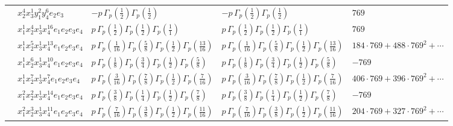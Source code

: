 \documentclass[11pt]{article}
\begin{document}
\begin{table}[ht]
{\begin{tabular}{@{}lllll@{}}
 & $x_{2}^{4} x_{3}^{1} y_{1}^{2} y_{4}^{6} e_{2} e_{3}$ & $- p \, \Gamma_p \left( \frac{1}{2} \right) \Gamma_p \left( \frac{1}{2} \right)$ & $- p \, \Gamma_p \left( \frac{1}{2} \right) \Gamma_p \left( \frac{1}{2} \right)$ & $769$ \\
 & $x_{1}^{1} x_{2}^{4} x_{3}^{1} x_{4}^{16}  e_{1} e_{2} e_{3} e_{4}$ & $p \, \Gamma_p \left( \frac{1}{2} \right) \Gamma_p \left( \frac{1}{2} \right) \Gamma_p \left( \frac{1}{1} \right)$ & $p \, \Gamma_p \left( \frac{1}{2} \right) \Gamma_p \left( \frac{1}{2} \right) \Gamma_p \left( \frac{1}{1} \right)$ & $769$ \\
 & $x_{1}^{1} x_{2}^{5} x_{3}^{1} x_{4}^{13}  e_{1} e_{2} e_{3} e_{4}$ & $p \, \Gamma_p \left( \frac{1}{16} \right) \Gamma_p \left( \frac{5}{8} \right) \Gamma_p \left( \frac{1}{2} \right) \Gamma_p \left( \frac{13}{16} \right)$ & $p \, \Gamma_p \left( \frac{1}{16} \right) \Gamma_p \left( \frac{5}{8} \right) \Gamma_p \left( \frac{1}{2} \right) \Gamma_p \left( \frac{13}{16} \right)$ & $184{\cdot}769{+}488{\cdot}769^{2}{+}\cdots$ \\
 & $x_{1}^{1} x_{2}^{6} x_{3}^{1} x_{4}^{10}  e_{1} e_{2} e_{3} e_{4}$ & $p \, \Gamma_p \left( \frac{1}{8} \right) \Gamma_p \left( \frac{3}{4} \right) \Gamma_p \left( \frac{1}{2} \right) \Gamma_p \left( \frac{5}{8} \right)$ & $p \, \Gamma_p \left( \frac{1}{8} \right) \Gamma_p \left( \frac{3}{4} \right) \Gamma_p \left( \frac{1}{2} \right) \Gamma_p \left( \frac{5}{8} \right)$ & $-769$ \\
 & $x_{1}^{1} x_{2}^{7} x_{3}^{1} x_{4}^{7}  e_{1} e_{2} e_{3} e_{4}$ & $p \, \Gamma_p \left( \frac{3}{16} \right) \Gamma_p \left( \frac{7}{8} \right) \Gamma_p \left( \frac{1}{2} \right) \Gamma_p \left( \frac{7}{16} \right)$ & $p \, \Gamma_p \left( \frac{3}{16} \right) \Gamma_p \left( \frac{7}{8} \right) \Gamma_p \left( \frac{1}{2} \right) \Gamma_p \left( \frac{7}{16} \right)$ & $406{\cdot}769{+}396{\cdot}769^{2}{+}\cdots$ \\
 & $x_{1}^{2} x_{2}^{2} x_{3}^{1} x_{4}^{14}  e_{1} e_{2} e_{3} e_{4}$ & $p \, \Gamma_p \left( \frac{3}{8} \right) \Gamma_p \left( \frac{1}{4} \right) \Gamma_p \left( \frac{1}{2} \right) \Gamma_p \left( \frac{7}{8} \right)$ & $p \, \Gamma_p \left( \frac{3}{8} \right) \Gamma_p \left( \frac{1}{4} \right) \Gamma_p \left( \frac{1}{2} \right) \Gamma_p \left( \frac{7}{8} \right)$ & $-769$ \\
 & $x_{1}^{2} x_{2}^{3} x_{3}^{1} x_{4}^{11}  e_{1} e_{2} e_{3} e_{4}$ & $p \, \Gamma_p \left( \frac{7}{16} \right) \Gamma_p \left( \frac{3}{8} \right) \Gamma_p \left( \frac{1}{2} \right) \Gamma_p \left( \frac{11}{16} \right)$ & $p \, \Gamma_p \left( \frac{7}{16} \right) \Gamma_p \left( \frac{3}{8} \right) \Gamma_p \left( \frac{1}{2} \right) \Gamma_p \left( \frac{11}{16} \right)$ & $204{\cdot}769{+}327{\cdot}769^{2}{+}\cdots$ \\

\end{tabular}}
\end{table}
\end{document}
